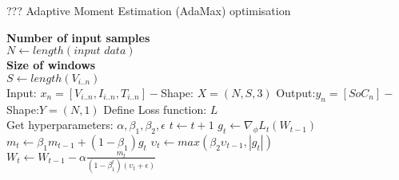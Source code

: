 \begin{algorithm}
  \caption{??? Adaptive Moment Estimation (AdaMax) optimisation}
  \begin{algorithmic}[1]
    \STATE \textbf{Number of input samples} \\ $N\gets length(\textit{input data})$\\
    \STATE \textbf{Size of windows} \\ $S\gets length(V_{i..n})$\\
    \STATE Input: $x_n = [V_{i..n}, I_{i..n}, T_{i..n}] - $Shape: $X = (N, S, 3)$
    \STATE Output:$y_n = [SoC_{n}] - $Shape:$Y = (N, 1)$
    \STATE Define Loss function: $L$ \\
           Get hyperparameters: $\alpha, \beta_1, \beta_2, \epsilon$
    \STATE $t \gets t+1$
    \STATE $g_t \gets \nabla_\phi L_t (W_{t-1})$ 
    \STATE $m_t \gets \beta_1 m_{t-1}+(1-\beta_1) g_t $ 
    \STATE $\upsilon_t \gets max\left(\beta_2\upsilon_{t-1}, |g_t|\right) $ 
    \STATE $W_t \gets W_{t-1}- \alpha \frac{m_t}{(1-\beta^t_1)(\upsilon_t+\epsilon)} $ 
    \ENDWHILE
  \end{algorithmic}
  \label{alg:adamax}
\end{algorithm}
